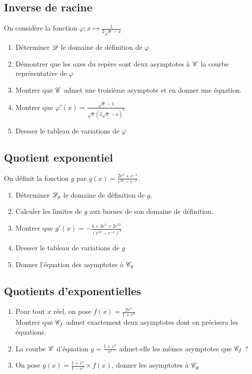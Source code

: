 \documentclass[oneside,12pt]{book}          %
\begin{document}
\subsection{Inverse de racine}
On considère la fonction $\varphi:x\mapsto \frac{1}{2\sqrt{x}-x}$
\begin{enumerate}
	\item Déterminer ${\mathscr{D}}$ le domaine de définition de $\varphi$
	\item Démontrer que les axes du repère sont deux asymptotes à ${\mathscr{C}}$ la courbe représentative de $\varphi$
	\item Montrer que ${\mathscr{C}}$ admet une troisième asymptote et en donner une équation.
	\item Montrer que $\varphi'(x)=\frac{\sqrt{x}-1}{\sqrt{x}(2\sqrt{x}-x)^2}$
	\item Dresser le tableau de variations de $\varphi$
\end{enumerate}



\subsection{Quotient exponentiel}
On définit la fonction $g$ par $g(x) = \frac{2e^x + e^{-x}}{e^{2x} - e^{-x}}$.
\begin{enumerate}
    \item Déterminer ${\mathscr{D}}_g$ le domaine de définition de $g$.
    \item Calculer les limites de $g$ aux bornes de son domaine de définition.
    \item Montrer que $g'(x)=-\frac{4+3e^x+2e^{3x}}{(e^{2x}-e^{-x})^2}$
    \item Dresser le tableau de variations de $g$
    \item Donner l'équation des asymptotes à ${\mathscr{C}}_g$
\end{enumerate}



\subsection{Quotients d'exponentielles}
\begin{enumerate}
    \item Pour tout $x$ réel, on pose $f(x)=\frac{2e^x}{1+e^x}$ \\
    Montrer que ${\mathscr{C}}_f$ admet exactement deux asymptotes dont on précisera les équations.
    \item La courbe ${\mathscr{C}}$ d'équation $y=\frac{1+e^x}{e^x}$ admet-elle les mêmes asymptotes que ${\mathscr{C}}_f$ ?
    \item On pose $g(x)=\frac{1+e^x}{1-e^x}\times f(x)$, donner les asymptotes à ${\mathscr{C}}_g$
\end{enumerate}
\end{document}

